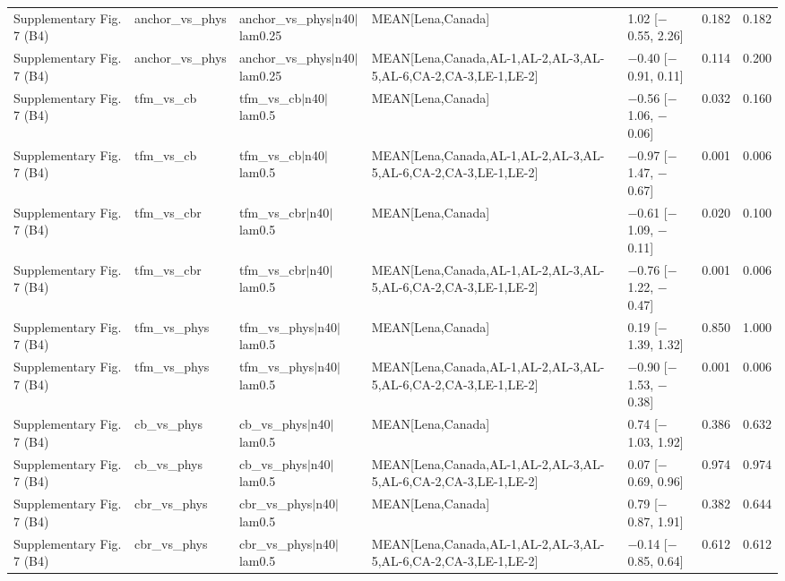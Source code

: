 \begin{longtable}{lllllrr}
Supplementary Fig. 7 (B4) & anchor\_vs\_phys & anchor\_vs\_phys$|$n40$|$lam0.25 & MEAN[Lena,Canada] & 1.02 [$-$0.55, 2.26] & 0.182 & 0.182 \\
Supplementary Fig. 7 (B4) & anchor\_vs\_phys & anchor\_vs\_phys$|$n40$|$lam0.25 & MEAN[Lena,Canada,AL-1,AL-2,AL-3,AL-5,AL-6,CA-2,CA-3,LE-1,LE-2] & $-$0.40 [$-$0.91, 0.11] & 0.114 & 0.200 \\
Supplementary Fig. 7 (B4) & tfm\_vs\_cb & tfm\_vs\_cb$|$n40$|$lam0.5 & MEAN[Lena,Canada] & $-$0.56 [$-$1.06, $-$0.06] & 0.032 & 0.160 \\
Supplementary Fig. 7 (B4) & tfm\_vs\_cb & tfm\_vs\_cb$|$n40$|$lam0.5 & MEAN[Lena,Canada,AL-1,AL-2,AL-3,AL-5,AL-6,CA-2,CA-3,LE-1,LE-2] & $-$0.97 [$-$1.47, $-$0.67] & 0.001 & 0.006 \\
Supplementary Fig. 7 (B4) & tfm\_vs\_cbr & tfm\_vs\_cbr$|$n40$|$lam0.5 & MEAN[Lena,Canada] & $-$0.61 [$-$1.09, $-$0.11] & 0.020 & 0.100 \\
Supplementary Fig. 7 (B4) & tfm\_vs\_cbr & tfm\_vs\_cbr$|$n40$|$lam0.5 & MEAN[Lena,Canada,AL-1,AL-2,AL-3,AL-5,AL-6,CA-2,CA-3,LE-1,LE-2] & $-$0.76 [$-$1.22, $-$0.47] & 0.001 & 0.006 \\
Supplementary Fig. 7 (B4) & tfm\_vs\_phys & tfm\_vs\_phys$|$n40$|$lam0.5 & MEAN[Lena,Canada] & 0.19 [$-$1.39, 1.32] & 0.850 & 1.000 \\
Supplementary Fig. 7 (B4) & tfm\_vs\_phys & tfm\_vs\_phys$|$n40$|$lam0.5 & MEAN[Lena,Canada,AL-1,AL-2,AL-3,AL-5,AL-6,CA-2,CA-3,LE-1,LE-2] & $-$0.90 [$-$1.53, $-$0.38] & 0.001 & 0.006 \\
Supplementary Fig. 7 (B4) & cb\_vs\_phys & cb\_vs\_phys$|$n40$|$lam0.5 & MEAN[Lena,Canada] & 0.74 [$-$1.03, 1.92] & 0.386 & 0.632 \\
Supplementary Fig. 7 (B4) & cb\_vs\_phys & cb\_vs\_phys$|$n40$|$lam0.5 & MEAN[Lena,Canada,AL-1,AL-2,AL-3,AL-5,AL-6,CA-2,CA-3,LE-1,LE-2] & 0.07 [$-$0.69, 0.96] & 0.974 & 0.974 \\
Supplementary Fig. 7 (B4) & cbr\_vs\_phys & cbr\_vs\_phys$|$n40$|$lam0.5 & MEAN[Lena,Canada] & 0.79 [$-$0.87, 1.91] & 0.382 & 0.644 \\
Supplementary Fig. 7 (B4) & cbr\_vs\_phys & cbr\_vs\_phys$|$n40$|$lam0.5 & MEAN[Lena,Canada,AL-1,AL-2,AL-3,AL-5,AL-6,CA-2,CA-3,LE-1,LE-2] & $-$0.14 [$-$0.85, 0.64] & 0.612 & 0.612 \\
\bottomrule
\end{longtable}
